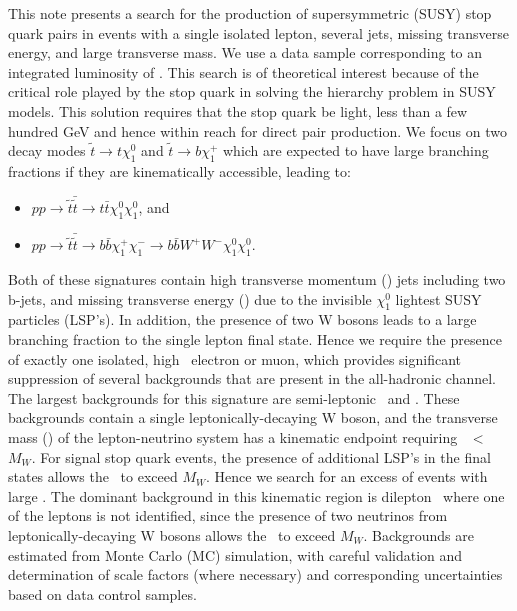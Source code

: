 
This note presents a search for the production of supersymmetric (SUSY) stop quark pairs in events with a 
single isolated lepton, several jets, missing transverse energy, and large transverse mass. We use a
data sample corresponding to an integrated luminosity of \lumi. 
This search is of theoretical interest because of the critical role played 
by the stop quark in solving the hierarchy problem in SUSY models. This solution requires that the stop quark 
be light, less than a few hundred GeV and hence within reach for direct pair production. We focus on two decay modes 
$\tilde{t}\rightarrow t\chi^0_1$ and $\tilde{t}\rightarrow b \chi^+_1$  which are expected
to have large branching fractions if they are kinematically accessible, leading to:

\begin{itemize}
\item $pp\rightarrow\tilde{t}\bar{\tilde{t}}\rightarrow t\bar{t}\chi^0_1\chi^0_1$, and
\item $pp\rightarrow\tilde{t}\bar{\tilde{t}}\rightarrow b\bar{b}\chi^+_1\chi^-_1 \rightarrow b\bar{b}W^+W^-\chi^0_1\chi^0_1$.
\end{itemize}

Both of these signatures contain high transverse momentum (\pt) jets including two b-jets, and missing transverse 
energy (\met) due to the invisible $\chi^0_1$ lightest SUSY particles (LSP's). In addition, the presence of
two W bosons leads to a large branching fraction to the single lepton final state. Hence we require the presence
of exactly one isolated, high \pt\ electron or muon, which provides significant suppression of several backgrounds
that are present in the all-hadronic channel. The largest backgrounds for this signature are semi-leptonic \ttbar\
and \wjets. These backgrounds contain a single leptonically-decaying W boson, and the transverse mass (\mt)
of the lepton-neutrino system has a kinematic endpoint requiring \mt\ $<$ $M_W$. For signal stop quark events,
the presence of additional LSP's in the final states allows the \mt\ to exceed $M_W$. Hence we search for an excess
of events with large \mt. The dominant background in this kinematic region is dilepton \ttbar\ where one of the
leptons is not identified, since the presence of two neutrinos from leptonically-decaying W bosons allows the 
\mt\ to exceed $M_W$. Backgrounds are estimated from Monte Carlo (MC) simulation, with careful validation 
and determination of scale factors (where necessary) and corresponding uncertainties based on data control samples.

